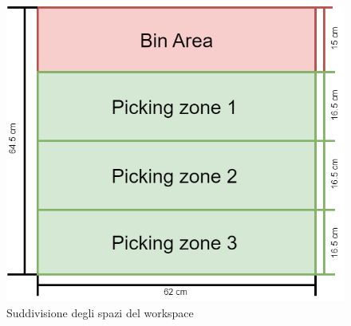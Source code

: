 \begin{figure}[h]
    \centering
    \includegraphics{Figure/Image/Dataset.png}
    \caption{Suddivisione degli spazi del workspace}
    \label{fig:workspace}
\end{figure}